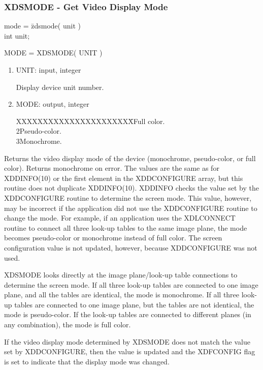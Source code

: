 \subsubsection{XDSMODE - Get Video Display Mode}
\begin{tabbing}
mode = \=zdsmode( unit )\\
\>int  unit;\\
\end{tabbing}
MODE = XDSMODE( UNIT )
\begin{enumerate}
\item UNIT:  input, integer

Display device unit number.
\item MODE:  output, integer
\begin{tabbing}
XXXXXXXXXXXXXXXXXXXXXX\=\>Full color.\\
2\>Pseudo-color.\\
3\>Monochrome.\\
\end{tabbing}
\end{enumerate}
Returns the video display mode of the device (monochrome,
pseudo-color, or full color).  Returns monochrome on error.
The values are the same as for
XDDINFO(10) or the first element in the XDDCONFIGURE array, but
this routine does not duplicate XDDINFO(10).  XDDINFO checks the
value set by the XDDCONFIGURE routine to determine the screen mode.
This value, however, may be incorrect if the application did not
use the XDDCONFIGURE routine to change the mode.  For example, if
an application uses the XDLCONNECT routine to connect all three
look-up tables to the same image plane, the mode becomes pseudo-color
or monochrome instead of full color.  The screen configuration
value is not updated, however, because XDDCONFIGURE was not used.

XDSMODE looks directly at the image plane/look-up table connections
to determine the screen mode.  If all three look-up tables are
connected to one image plane, and all the tables are identical,
the mode is monochrome.  If all three look-up tables are connected
to one image plane, but the tables are not identical, the mode is
pseudo-color.  If the look-up tables are connected to different
planes (in any combination), the mode is full color.

If the video display mode determined by XDSMODE does not match the
value set by XDDCONFIGURE, then the value is updated and the XDFCONFIG
flag is set to indicate that the display mode was changed.
\newpage
